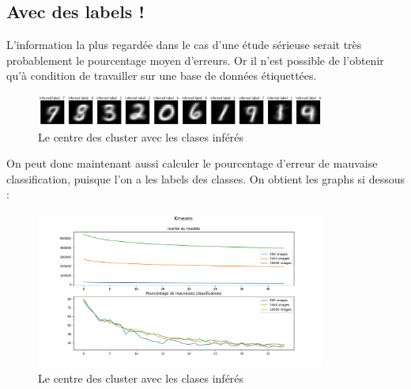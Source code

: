 \documentclass{article}
\begin{document}
\subsection{Avec des labels !}
L'information la plus regardée dans le cas d'une étude sérieuse serait très probablement le pourcentage moyen d'erreurs. Or il n'est possible de l'obtenir qu'à condition de travailler sur une base de données étiquettées.  \\


\begin{figure}[H]
	\centering
	\includegraphics[width=0.85\textwidth]{"./Images/inf.png"}
	\caption{\centering Le centre des cluster avec les clases inférés}
\end{figure}



On peut donc maintenant aussi calculer le pourcentage d'erreur de mauvaise classification, puisque l'on a les labels des classes. On obtient les graphs si dessous : 

\begin{figure}[H]
	\centering
	\includegraphics[width=0.85\textwidth]{"./Images/Kmeans_no_prepo_erreur.png"}
	\caption{\centering Le centre des cluster avec les clases inférés}
\end{figure}
\end{document}
